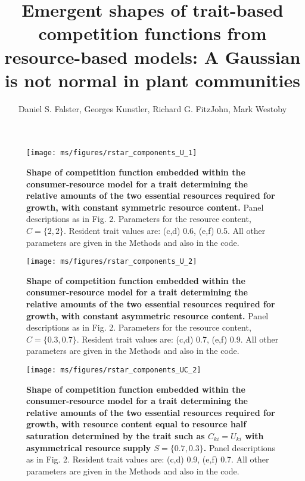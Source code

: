 \documentclass[10pt,twoside]{article}
\title{Emergent shapes of trait-based competition functions from resource-based models: A Gaussian is not normal in plant communities}
\date{}
\author{Daniel S. Falster, Georges Kunstler, Richard G. FitzJohn, Mark Westoby}
\makeatletter
\renewcommand{\thefigure}{A\@arabic\c@figure}
\makeatother
\begin{document}
\maketitle

\setcounter{secnumdepth}{1}

\renewcommand{\thefigure}{A\arabic{figure}}
\setcounter{figure}{0}

\begin{figure}[ht]
 \centering
	\texttt{[image: ms/figures/rstar\_components\_U\_1]}
 \caption{{\bf Shape of competition function embedded within the consumer-resource model for a trait determining the relative amounts of the two essential resources required for growth, with constant symmetric resource content.} Panel descriptions as in Fig. 2. Parameters for the resource content, $C = \{2, 2\}$. Resident trait values are: (c,d) 0.6, (e,f) 0.5. All other parameters are given in the Methods and also in the code.}
 \label{figS:Rstar_U1}
\end{figure}

\newpage
\begin{figure}[ht]
 \centering
	\texttt{[image: ms/figures/rstar\_components\_U\_2]}
 \caption{{\bf Shape of competition function embedded within the consumer-resource model for a trait determining the relative amounts of the two essential resources required for growth, with constant asymmetric resource content.} Panel descriptions as in Fig. 2. Parameters for the resource content, $C = \{0.3, 0.7\}$. Resident trait values are: (c,d) 0.7, (e,f) 0.9. All other parameters are given in the Methods and also in the code.}
 \label{figS:Rstar_U2}
\end{figure}

\newpage
\begin{figure}[ht]
 \centering
 \texttt{[image: ms/figures/rstar\_components\_UC\_2]}
 \caption{{\bf Shape of competition function embedded within the consumer-resource model for a trait determining the relative amounts of the two essential resources required for growth, with resource content equal to resource half saturation determined by the trait such as $C_{ki} = U_{ki}$ with asymmetrical resource supply $S = \{0.7, 0.3\}$.} Panel descriptions as in Fig. 2. Resident trait values are: (c,d) 0.9, (e,f) 0.7. All other parameters are given in the Methods and also in the code.} 
 \label{fig:Srstar_components_UC2}
\end{figure}
\end{document}
